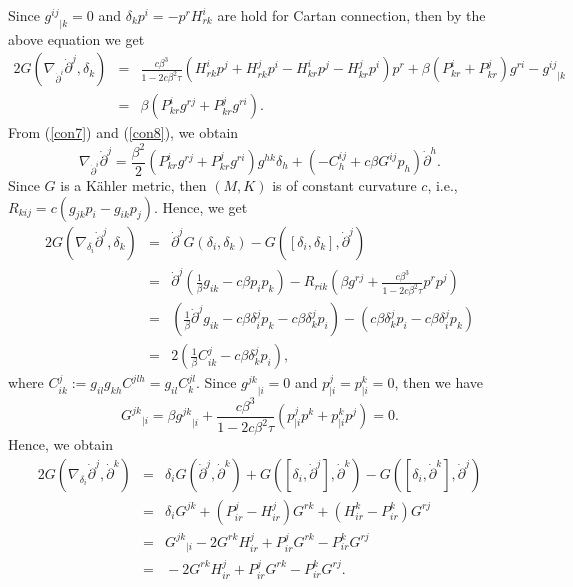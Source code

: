 \documentclass[10pt,a4paper]{article}
\theoremstyle{plain}
\theoremstyle{definition}
\begin{document}
Since ${g^{ij}}_{|k}=0$ and $\delta_kp^i=-p^rH^i_{rk}$ are hold for Cartan connection, then  by the above equation we get
\begin{eqnarray}
2G(\nabla_{{\dot{\partial}}^i}{\dot{\partial}}^j,\delta_k)\!\!\!\!&=&\!\!\!\!
\frac{c\beta^3}{1-2c\beta^2\tau}(H^i_{rk}p^j+H^j_{rk}p^i-H^i_{kr}p^j-H^j_{kr}p^i)p^r+
\beta(P^i_{kr}+P^j_{kr})g^{ri}-{g^{ij}}_{|k}\nonumber\\
 \!\!\!\!&=&\!\!\!\!\beta(P^i_{kr}g^{rj}+P^j_{kr}g^{ri}).\label{con8}
\end{eqnarray}
From (\ref{con7}) and (\ref{con8}), we obtain
\begin{equation}
\nabla_{{\dot{\partial}}^i}{\dot{\partial}}^j=\frac{\beta^2}{2}(P^i_{kr}g^{rj}+P^j_{kr}g^{ri})g^{hk}\delta_h+(-C^{ij}_h+c\beta
G^{ij}p_h){\dot{\partial}}^h.\label{con3}
\end{equation}
Since $G$ is a K\"{a}hler metric, then $(M,K)$ is of constant
curvature $c$, i.e., $R_{kij}=c(g_{jk}p_i-g_{ik}p_j)$. Hence, we
get
\begin{eqnarray}
2G(\nabla_{\delta_i}{\dot{\partial}}^j,\delta_k)\!\!\!\!&=&\!\!\!\!{\dot{\partial}}^jG(\delta_i,\delta_k)
-G([\delta_i,\delta_k],{\dot{\partial}}^j)\nonumber\\
\!\!\!\!&=&\!\!\!\!{\dot{\partial}}^j(\frac{1}{\beta}g_{ik}-c\beta p_ip_k)-R_{rik}(\beta g^{rj}+\frac{c\beta^3}{1-2c\beta^2\tau}p^rp^j)\nonumber\\
\!\!\!\!&=&\!\!\!\!(\frac{1}{\beta}{\dot{\partial}}^jg_{ik}-c\beta\delta^j_ip_k-c\beta\delta^j_kp_i)-(c\beta\delta^j_kp_i-c\beta\delta^j_ip_k)\nonumber\\
\!\!\!\!&=&\!\!\!\!2(\frac{1}{\beta}C^j_{ik}-c\beta\delta^j_kp_i),\label{con}
\end{eqnarray}
where $C^j_{ik}:=g_{il}g_{kh}C^{jlh}=g_{il}C^{jl}_k$. Since
${g^{jk}}_{|i}=0$ and $p^j_{|i}=p^k_{|i}=0$, then we have
\[
{G^{jk}}_{|i}=\beta{g^{jk}}_{|i}+\frac{c\beta^3}{1-2c\beta^2\tau}(p^j_{|i}p^k+p^k_{|i}p^j)=0.
\]
Hence, we obtain
\begin{eqnarray}
2G(\nabla_{\delta_i}{\dot{\partial}}^j,{\dot{\partial}}^k)\!\!\!\!&=&\!\!\!\!\delta_iG({\dot{\partial}}^j,{\dot{\partial}}^k)
+G([\delta_i,{\dot{\partial}}^j],{\dot{\partial}}^k)-G([\delta_i,{\dot{\partial}}^k],{\dot{\partial}}^j)\nonumber\\
\!\!\!\!&=&\!\!\!\!\delta_iG^{jk}+(P^j_{ir}-H^j_{ir})G^{rk}+(H^k_{ir}-P^k_{ir})G^{rj}\nonumber\\
\!\!\!\!&=&\!\!\!\!{G^{jk}}_{|i}-2G^{rk}H^j_{ir}+P^j_{ir}G^{rk}-P^k_{ir}G^{rj}\nonumber\\
\!\!\!\!&=&\!\!\!\!-2G^{rk}H^j_{ir}+P^j_{ir}G^{rk}-P^k_{ir}G^{rj}.\label{con1}
\end{eqnarray}
\end{document}
